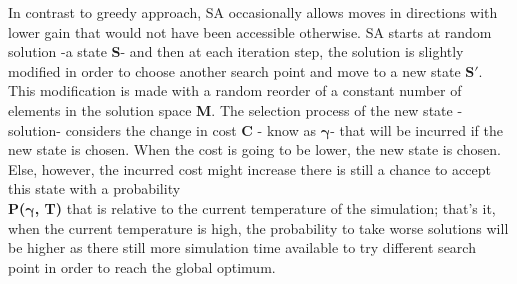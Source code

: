 \documentclass[twocolumn]{article}
\begin{document}
	In contrast to greedy approach, SA occasionally allows moves in directions with lower gain that would not have been accessible otherwise. SA starts at random solution -a state {\bfseries S}- and then at each iteration step, the solution is slightly modified in order to choose another search point and move to a new state $\boldsymbol{S\prime}$. This modification is made with a random reorder of a constant number of elements in the solution space {\bfseries M}. The selection process of the new state -solution- considers the change in cost {\bfseries C} - know as {$\boldsymbol \gamma$}- that will be incurred if the new state is chosen. When the cost is going to be lower, the new state is chosen. Else, however, the incurred cost might increase there is still a chance to accept this state with a probability \\{\bfseries P({$\boldsymbol \gamma$}, T)} that is relative to the current temperature of the simulation; that's it, when the current temperature is high, the probability to take worse solutions will be higher as there still more simulation time available to try different search point in order to reach the global optimum.
	 
\end{document}
